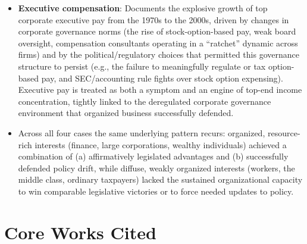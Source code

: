\documentclass[12pt]{article}
\begin{document}
\begin{itemize}[leftmargin=*, itemsep=4pt]
    \item \textbf{Executive compensation}: Documents the explosive growth of top corporate executive pay from the 1970s to the 2000s, driven by changes in corporate governance norms (the rise of stock-option-based pay, weak board oversight, compensation consultants operating in a ``ratchet'' dynamic across firms) and by the political/regulatory choices that permitted this governance structure to persist (e.g., the failure to meaningfully regulate or tax option-based pay, and SEC/accounting rule fights over stock option expensing). Executive pay is treated as both a symptom and an engine of top-end income concentration, tightly linked to the deregulated corporate governance environment that organized business successfully defended.
    \item Across all four cases the same underlying pattern recurs: organized, resource-rich interests (finance, large corporations, wealthy individuals) achieved a combination of (a) affirmatively legislated advantages and (b) successfully defended policy drift, while diffuse, weakly organized interests (workers, the middle class, ordinary taxpayers) lacked the sustained organizational capacity to win comparable legislative victories or to force needed updates to policy.
\end{itemize}

\section{Core Works Cited}
\end{document}
